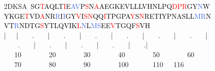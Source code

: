\begin{figure}[p]
\begin{center}
{{\begin{minipage}{0.9\textwidth}
\begin{tiny}
\begin{tabbing}
2DKSA\ \textcolor{black}{SG}\textcolor{Red}{T}\textcolor{black}{AQLT}\textcolor{Red}{I}\textcolor{black}{E}\textcolor{RoyalBlue}{AV}\textcolor{black}{P}\textcolor{Red}{S}\textcolor{black}{N}\textcolor{Red}{A}\textcolor{black}{AEGKEVLLLVHNLPQ}\textcolor{Red}{DPR}\textcolor{black}{GY}\textcolor{RoyalBlue}{N}\textcolor{black}{WYKGE}\textcolor{Red}{T}\textcolor{black}{VD}\textcolor{Red}{A}\textcolor{black}{NR}\textcolor{RoyalBlue}{R}\textcolor{black}{I}\textcolor{RoyalBlue}{I}\textcolor{black}{GY}\textcolor{Red}{V}\textcolor{black}{I}\textcolor{Red}{SN}\textcolor{black}{QQ}\textcolor{Red}{I}\textcolor{black}{TPGPA}\textcolor{Red}{Y}\textcolor{black}{S}\textcolor{Red}{N}\textcolor{black}{RETIYPNASLL}\textcolor{RoyalBlue}{MR}\textcolor{black}{NVT}\textcolor{RoyalBlue}{R}\textcolor{black}{NDTG}\textcolor{Red}{S}\textcolor{black}{YTLQVIK}\textcolor{Red}{L}\textcolor{RoyalBlue}{N}\textcolor{black}{L}\textcolor{RoyalBlue}{MS}\textcolor{black}{EE}\textcolor{Red}{V}\textcolor{black}{TGQF}\textcolor{Red}{S}\textcolor{black}{VH}
\\
\>|\ \ \ |\ \ \ \ .\ \ \ \ |\ \ \ \ .\ \ \ \ |\ \ \ \ .\ \ \ \ |\ \ \ \ .\ \ \ \ |\ \ \ \ .\ \ \ \ |\ \ \ \ .\ \ \ \ |\ \ \ \ .\ \ \ \ |\ \ \ \ .\ \ \ \ |\ \ \ \ .\ \ \ \ |\ \ \ \ .\ \ \ \ |\ \ \ \ .| \\
\ \ \ 10\ \ \ \ \ \ \ \ 20\ \ \ \ \ \ \ \ 30\ \ \ \ \ \ \ \ 40\ \ \ \ \ \ \ \ 50\ \ \ \ \ \ \ \ 60\ \ \ \ \ \ \ \ 70\ \ \ \ \ \ \ \ 80\ \ \ \ \ \ \ \ 90\ \ \ \ \ \ \ \ 100\ \ \ \ \ \ \ 110\ \ \ 116


\end{tabbing}
\end{tiny}
\end{minipage}
}}

\vspace{0.4cm}

\mbox{
}


\end{center}
\end{figure}
